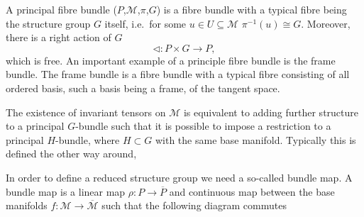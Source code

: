 A principal fibre bundle ($P$,$\mathcal{M}$,$\pi$,$G$) is a fibre bundle with a typical fibre being the structure group $G$ itself, i.e.\ for some $u\in U\subseteq \mathcal{M}$ $\pi^{-1}(u)\cong G$. Moreover, there is a right action of $G$
\begin{equation}
    \triangleleft: P\times G \to P,
\end{equation}
which is free. An important example of a principle fibre bundle is the frame bundle. The frame bundle is a fibre bundle with a typical fibre consisting of all ordered basis, such a basis being a frame, of the tangent space. 

The existence of invariant tensors on $\mathcal{M}$ is equivalent to adding further structure to a principal $G$-bundle such that it is possible to impose a restriction to a principal $H$-bundle, where $H\subset G$ with the same base manifold. Typically this is defined the other way around,  


In order to define a reduced structure group we need a so-called bundle map. A bundle map is a linear map $\rho: P\to \overbar{P}$ and continuous map between the base manifolds $f: \mathcal{M}\to \overbar{\mathcal{M}}$ such that the following diagram commutes
\begin{center}
\end{center}


